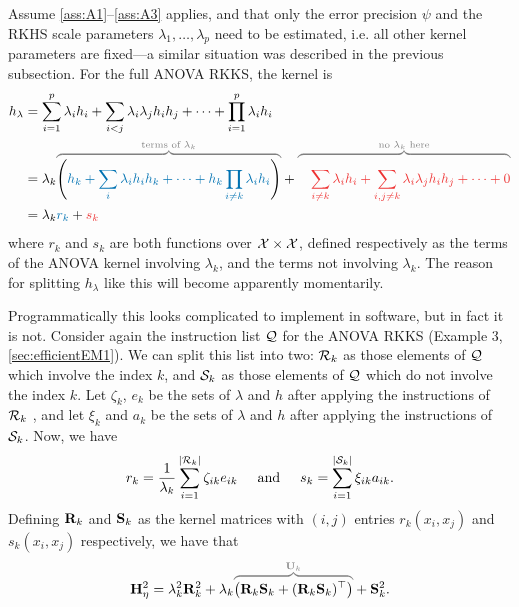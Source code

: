 Assume \ref{ass:A1}--\ref{ass:A3} applies, and that only the error precision $\psi$ and the RKHS scale parameters $\lambda_1,\dots,\lambda_p$ need to be estimated, i.e. all other kernel parameters are fixed---a similar situation was described in the previous subsection.
For the full ANOVA RKKS, the kernel is
\begin{align*}
  h_\lambda 
  &= \sum_{i=1}^p \lambda_i h_i + \sum_{i<j} \lambda_i \lambda_j h_i h_j + \cdots + \prod_{i=1}^p \lambda_i h_i \\
  &= \lambda_k 
  \myoverbrace{
  \Bigg(  
  {\color{colblu} h_k + \sum_{i} \lambda_i h_i h_k + \cdots + h_k \prod_{i\neq k} \lambda_i h_i}
  \Bigg)
  }{\text{terms of $\lambda_k$}} 
  + 
  \myoverbrace{\color{colred}
  \phantom{\Bigg(}
  \sum_{i\neq k} \lambda_i h_i + \sum_{i,j \neq k} \lambda_i \lambda_j h_i h_j + \cdots + 0
  }{\text{no $\lambda_k$ here}} \\
  &= \lambda_k {\color{colblu}r_k} + {\color{colred}s_k}
\end{align*}
where $r_k$ and $s_k$ are both functions over ${\mathcal X}\times{\mathcal X}$, defined respectively as the terms of the ANOVA kernel involving $\lambda_k$, and the terms not involving $\lambda_k$.
The reason for splitting $h_\lambda$ like this will become apparently momentarily.

Programmatically this looks complicated to implement in software, but in fact it is not.
Consider again the instruction list ${\mathcal Q}$ for the ANOVA RKKS (Example 3, \cref{sec:efficientEM1}).
We can split this list into two: ${\mathcal R}_k$ as those elements of ${\mathcal Q}$ which involve the index $k$, and ${\mathcal S}_k$ as those elements of ${\mathcal Q}$ which do not involve the index $k$.
Let $\zeta_k$, $e_k$ be the sets of $\lambda$ and $h$ after applying the instructions of ${\mathcal R}_k$ 
, and let $\xi_k$ and $a_k$ be the sets of $\lambda$ and $h$ after applying the instructions of ${\mathcal S}_k$.
Now, we have 
\[
  r_k = \frac{1}{\lambda_k} \sum_{i=1}^{\lvert{\mathcal R}_k\rvert} \zeta_{ik} e_{ik} 
  \hspace{0.5cm}\text{and}\hspace{0.5cm}
  s_k = \sum_{i=1}^{\lvert{\mathcal S}_k\rvert} \xi_{ik} a_{ik}.   
\]
Defining ${\mathbf R}_k$ and ${\mathbf S}_k$ as the kernel matrices with $(i,j)$ entries $r_k(x_i,x_j)$ and $s_k(x_i,x_j)$ respectively, we have that
\[
  \bH_\eta^2 = \lambda_k^2\bR_k^2 + \lambda_k \myoverbrace{\big(\bR_k\bS_k + (\bR_k\bS_k)^\top \big)}{\bU_k} + \bS_k^2.
\]

